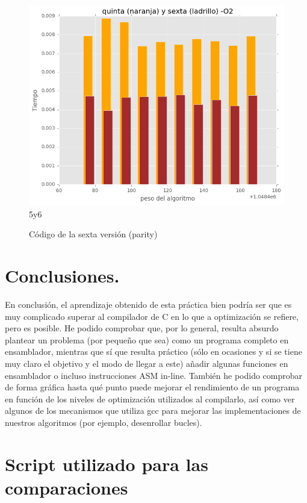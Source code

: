 \documentclass[a4paper, 11pt]{article}
\begin{document}
\begin{figure}[!hbp]
	\includegraphics[scale=0.6]{5y6p_2.png}
	\caption{5y6	\label{5y6_2}}
\end{figure}
\begin{figure}[!hbp]
	
	\caption{Código de la sexta versión (parity)	\label{parity sexta versión}}
\end{figure}

\pagebreak

\appendix
\section{Conclusiones.}
En conclusión, el aprendizaje obtenido de esta práctica bien podría ser que es muy complicado superar al compilador de C en lo que a optimización se refiere, pero es posible. He podido comprobar que, por lo general, resulta absurdo plantear un problema (por pequeño que sea) como un programa completo en ensamblador, mientras que sí que resulta práctico (sólo en ocasiones y si se tiene muy claro el objetivo y el modo de llegar a este) añadir algunas funciones en ensamblador o incluso instrucciones ASM in-line. También he podido comprobar de forma gráfica hasta qué punto puede mejorar el rendimiento de un programa en función de los niveles de optimización utilizados al compilarlo, así como ver algunos de los mecanismos que utiliza gcc para mejorar las implementaciones de nuestros algoritmos (por ejemplo, desenrollar bucles). 

\section{Script utilizado para las comparaciones}
\end{document}
